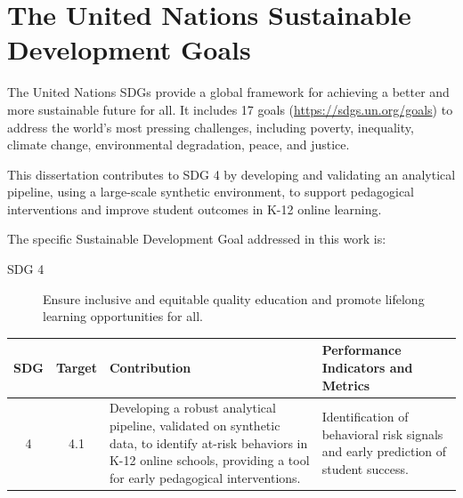 
\chapter*{The United Nations Sustainable Development Goals} \label{chap:UnitedNations}

The United Nations \acp{SDG} provide a global framework for achieving a better and more sustainable future for all. 
It includes 17 goals (\url{https://sdgs.un.org/goals}) to address the world's most pressing challenges, including poverty, inequality, climate change, environmental degradation, peace, and justice. 

This dissertation contributes to SDG 4 by developing and validating an analytical pipeline, using a large-scale synthetic environment, to support pedagogical interventions and improve student outcomes in K-12 online learning.

The specific Sustainable Development Goal addressed in this work is:

\begin{description}
\item [SDG 4]
Ensure inclusive and equitable quality education and promote lifelong learning opportunities for all.
\end{description}

\begin{center}
\renewcommand{\arraystretch}{1.3}
\begin{tabular}{c c p{5.5cm} p{6cm}}
\toprule
\textbf{SDG} & \textbf{Target} & \textbf{Contribution} & \textbf{Performance Indicators and Metrics} \\
\midrule
4 & 4.1 &
Developing a robust analytical pipeline, validated on synthetic data, to identify at-risk behaviors in K-12 online schools, providing a tool for early pedagogical interventions.
&
Identification of behavioral risk signals and early prediction of student success. \\
\bottomrule
\end{tabular}
\end{center}